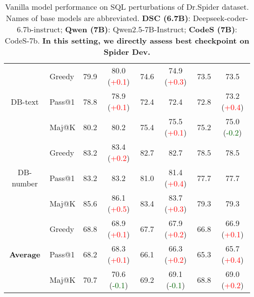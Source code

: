 \begin{table*}[t!]
\begin{adjustbox}{max width=\textwidth}
\begin{tabular}{c | l | c c | c c | c c }
        \multirow{3}{*}{DB-text} & Greedy & 79.9 & 80.0 (\textcolor{red}{+0.1}) & 74.6 & 74.9 (\textcolor{red}{+0.3}) & 73.5 & 73.5 \phantom{(+0.3)} \\
& Pass@1 & 78.8 & 78.9 (\textcolor{red}{+0.1}) & 72.4 & 72.4 \phantom{(+0.3)} & 72.8 & 73.2 (\textcolor{red}{+0.4}) \\
& Maj@K & 80.2 & 80.2 \phantom{(+0.3)} & 75.4 & 75.5 (\textcolor{red}{+0.1}) & 75.2 & 75.0 (\textcolor{darkgreen}{-0.2}) \\
 \midrule

        \multirow{3}{*}{DB-number} & Greedy & 83.2 & 83.4 (\textcolor{red}{+0.2}) & 82.7 & 82.7 \phantom{(+0.3)} & 78.5 & 78.5 \phantom{(+0.3)} \\
& Pass@1 & 83.2 & 83.2 \phantom{(+0.3)} & 81.0 & 81.4 (\textcolor{red}{+0.4}) & 77.7 & 77.7 \phantom{(+0.3)} \\
& Maj@K & 85.6 & 86.1 (\textcolor{red}{+0.5}) & 83.4 & 83.7 (\textcolor{red}{+0.3}) & 79.3 & 79.3 \phantom{(+0.3)} \\
 \midrule

        \multirow{3}{*}{\textbf{Average}} & Greedy & 68.8 & 68.9 (\textcolor{red}{+0.1}) & 67.7 & 67.9 (\textcolor{red}{+0.2}) & 66.8 & 66.9 (\textcolor{red}{+0.1}) \\
& Pass@1 & 68.2 & 68.3 (\textcolor{red}{+0.1}) & 66.1 & 66.3 (\textcolor{red}{+0.2}) & 65.3 & 65.7 (\textcolor{red}{+0.4}) \\
& Maj@K & 70.7 & 70.6 (\textcolor{darkgreen}{-0.1}) & 69.2 & 69.1 (\textcolor{darkgreen}{-0.1}) & 68.8 & 69.0 (\textcolor{red}{+0.2}) \\

        
        \bottomrule
    \end{tabular}
\end{adjustbox}
    \caption{Vanilla model performance on SQL perturbations of Dr.Spider dataset. Names of base models are abbreviated. \textbf{DSC (6.7B)}: Deepseek-coder-6.7b-instruct; \textbf{Qwen (7B)}: Qwen2.5-7B-Instruct; \textbf{CodeS (7B)}: CodeS-7b. \textbf{In this setting, we directly assess best checkpoint on Spider Dev.}}
    \label{tab:drSpiderSQLVanilla}
\end{table*}